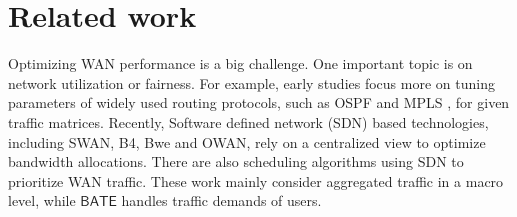 \documentclass[sigconf]{acmart}
\begin{document}
%
%
%
%
%
%
%
%
%
%
%
%
%






\section{Related work}\label{relate}

Optimizing WAN performance is a big challenge. One important topic is on network utilization or fairness. 
For example, early studies focus more on tuning parameters of widely used routing protocols, such as OSPF \cite{OSPF} and MPLS \cite{MATE,Tightrope}, for given traffic matrices. 
Recently, Software defined network (SDN) based technologies, including SWAN\cite{swan}, B4\cite{B4,hong2018b4}, Bwe\cite{bwe} and OWAN\cite{OWAN}, rely on a centralized view to optimize 
bandwidth allocations. 
There are also scheduling algorithms \cite{calendaring,dynamic,D3} using SDN to prioritize WAN traffic.
These work mainly consider aggregated traffic in a macro level, while $\mathsf{BATE}$ handles traffic demands of users. 
\end{document}
